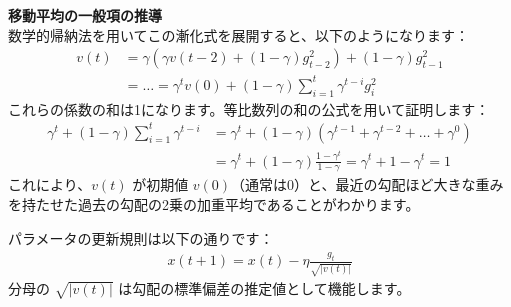 \documentclass[dvipdfmx,a4paper,11pt]{jsarticle}
\begin{document}
\hosoku \textbf{移動平均の一般項の推導}\\
数学的帰納法を用いてこの漸化式を展開すると、以下のようになります：
\begin{align*}
    v(t) &= \gamma (\gamma v(t-2) + (1-\gamma)g_{t-2}^2) + (1-\gamma)g_{t-1}^2 \\
         &= \dots = \gamma^t v(0) + (1 - \gamma)\sum_{i=1}^t \gamma^{t-i}g_i^2
\end{align*}
これらの係数の和は1になります。等比数列の和の公式を用いて証明します：
\begin{align*}
    \gamma^t + (1 - \gamma) \sum_{i=1}^t \gamma^{t-i} 
    &= \gamma^t + (1 - \gamma) \left( \gamma^{t-1} + \gamma^{t-2} + \dots + \gamma^0 \right) \\
    &= \gamma^t + (1 - \gamma) \frac{1 - \gamma^t}{1 - \gamma} = \gamma^t + 1 - \gamma^t = 1
\end{align*}
これにより、$v(t)$ が初期値 $v(0)$（通常は0）と、最近の勾配ほど大きな重みを持たせた過去の勾配の2乗の加重平均であることがわかります。

パラメータの更新規則は以下の通りです：
\begin{align*}
    x(t + 1) = x(t) - \eta \frac{g_t}{\sqrt{|v(t)|}}
\end{align*}
分母の $\sqrt{|v(t)|}$ は勾配の標準偏差の推定値として機能します。
\end{document}
